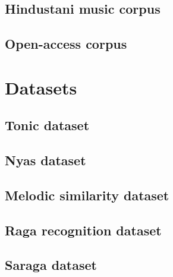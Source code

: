 \subsection{Hindustani music corpus}

\subsection{Open-access corpus}

\section{Datasets}

\subsection{Tonic dataset}

\subsection{Nyas dataset}

\subsection{Melodic similarity dataset}

\subsection{Raga recognition dataset}

\subsection{Saraga dataset}








